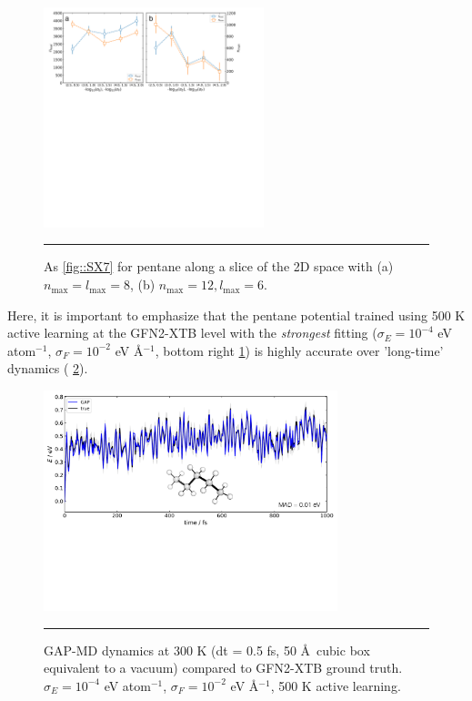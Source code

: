 \documentclass[11pt]{article}
\numberwithin{equation}{subsection}
\begin{document}
\begin{figure}[h!]
	\centering
	\includegraphics[height=6.4cm]{figSX9.pdf}
	\vspace{0.1cm}
	\hrule
	\vspace{0.1cm}
	\caption{As \figurename{ \ref{fig::SX7}} for pentane along a slice of the 2D space with (a) $n_\text{max} = l_\text{max} = 8$, (b) $n_\text{max} = 12, l_\text{max} = 6$.}
	\label{fig::SX9}
\end{figure}

Here, it is important to emphasize that the pentane potential trained using 500 K active learning at the GFN2-XTB level with the \emph{strongest} fitting ($\sigma_E = 10^{-4}$ eV atom${}^{-1}$, $\sigma_F = 10^{-2}$ eV \AA$^{-1}$, bottom right \figurename{ \ref{fig::SX9}}) is highly accurate over 'long-time' dynamics (\figurename{ \ref{fig::SX20}}).


\begin{figure}[h!]
	\centering
	\includegraphics[height=6.4cm]{figSX20.pdf}
	\vspace{0.1cm}
	\hrule
	\vspace{0.1cm}
	\caption{GAP-MD dynamics at 300 K (dt = 0.5 fs, 50 \AA~cubic box equivalent to a vacuum) compared to GFN2-XTB ground truth. $\sigma_E = 10^{-4}$ eV atom${}^{-1}$, $\sigma_F = 10^{-2}$ eV \AA$^{-1}$, 500 K active learning.}
	\label{fig::SX20}
\end{figure}
\end{document}
